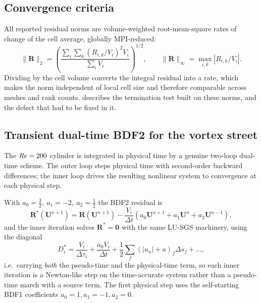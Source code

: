 \subsection{Convergence criteria}
\label{sec:criteria}

All reported residual norms are volume-weighted root-mean-square rates of change
of the cell average, globally MPI-reduced:
\begin{equation}
  \|\mathbf{R}\|_2=\left(\frac{\sum_i \sum_k
  \left(R_{i,k}/V_i\right)^2 V_i}{\sum_i V_i}\right)^{1/2},
  \qquad
  \|\mathbf{R}\|_\infty=\max_{i,k}\left|R_{i,k}/V_i\right| .
  \label{eq:norms}
\end{equation}
Dividing by the cell volume converts the integral residual into a rate, which
makes the norm independent of local cell size and therefore comparable across
meshes and rank counts.  describes the termination test
built on these norms, and the defect that had to be fixed in it.

\subsection{Transient dual-time BDF2 for the vortex street}
\label{sec:bdf2}

The $\mathit{Re}=200$ cylinder is integrated in physical time by a genuine two-loop
dual-time scheme. The outer loop steps physical time with second-order backward
differences; the inner loop drives the resulting nonlinear system to convergence
at each physical step.

With $a_0=\tfrac32,\ a_1=-2,\ a_2=\tfrac12$ the BDF2 residual is
\begin{equation}
  \mathbf{R}^\ast(\mathbf{U}^{n+1})=\mathbf{R}(\mathbf{U}^{n+1})
  -\frac{V_i}{\Delta t}\left(a_0\mathbf{U}^{n+1}+a_1\mathbf{U}^{n}+a_2\mathbf{U}^{n-1}\right),
  \label{eq:bdf2}
\end{equation}
and the inner iteration solves $\mathbf{R}^\ast=\mathbf{0}$ with the same LU-SGS
machinery, using the diagonal
\begin{equation}
  D_i^\ast=\frac{V_i}{\Delta\tau_i}+\frac{a_0 V_i}{\Delta t}
  +\frac12\sum_f\left(|u_n|+a\right)_f\Delta s_f+\dots,
  \label{eq:bdf2diag}
\end{equation}
i.e.\ carrying \emph{both} the pseudo-time and the physical-time term, so each
inner iteration is a Newton-like step on the time-accurate system rather than a
pseudo-time march with a source term. The first physical step uses the
self-starting BDF1 coefficients $a_0=1,a_1=-1,a_2=0$.

